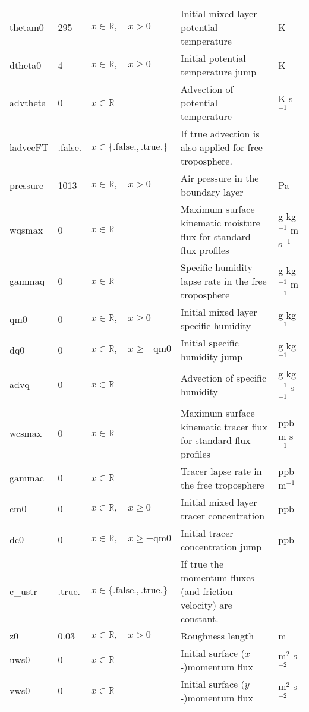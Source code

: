 \documentclass[twoside,11pt,fleqn,a4paper,english,openright]{report}
\begin{document}
\begin{center}
\begin{supertabular}{|l|p{1.2cm}|p{3.4cm}|p{5cm}|l|}
thetam0	& 295		&	$x \in \mathbb{R}, \quad x > 0$		& Initial mixed layer potential temperature	&	K\\
dtheta0	&	4			&	$x \in \mathbb{R},\quad x \geq 0$	& Initial potential temperature jump	&	K\\
advtheta&	0				&	$x \in \mathbb{R}$								&	Advection of potential temperature	& K s$^{-1}$\\
ladvecFT& .false. &	$x\in\{\text{.false.},\text{.true.}\}$	& If true advection is also applied for free troposphere.	& -\\
pressure	&	1013	&	$x \in \mathbb{R}, \quad x > 0$	& Air pressure in the boundary layer	&	Pa\\
wqsmax	&	0			&	$x \in \mathbb{R}$								&	Maximum surface kinematic moisture flux for standard flux profiles	& g kg$^{-1}$ m s$^{-1}$\\
gammaq	&	0			&	$x \in \mathbb{R}$								& Specific humidity lapse rate in the free troposphere	&	g kg$^{-1}$ m$^{-1}$\\
qm0		& 0				&	$x \in \mathbb{R}, \quad x \geq 0$		& Initial mixed layer specific humidity	&	g kg$^{-1}$\\
dq0		&	0				&	$x \in \mathbb{R},\quad x \geq - \text{qm0}$	& Initial specific humidity jump	&	g kg$^{-1}$\\
advq	&	0				&	$x \in \mathbb{R}$								&	Advection of specific humidity	& g kg$^{-1}$ s$^{-1}$\\
wcsmax	&	0			&	$x \in \mathbb{R}$								&	Maximum surface kinematic tracer flux for standard flux profiles	& ppb m s$^{-1}$\\
gammac	&	0			&	$x \in \mathbb{R}$								& Tracer lapse rate in the free troposphere	&	ppb m$^{-1}$\\
cm0		& 0				&	$x \in \mathbb{R}, \quad x \geq 0$		& Initial mixed layer tracer concentration	&	ppb\\
dc0		&	0				&	$x \in \mathbb{R},\quad x \geq - \text{qm0}$	& Initial tracer concentration jump	&	ppb\\
c\_ustr	&	.true.	&	$x\in\{\text{.false.},\text{.true.}\}$	& If true the momentum fluxes (and friction velocity) are constant.	& -\\
z0		&	0.03		&	$x \in \mathbb{R}, \quad x > 0$		& Roughness length	&	m\\
uws0	&	0				&	$x \in \mathbb{R}$								&	Initial surface ($x$-)momentum flux	& m$^{2}$ s$^{-2}$\\
vws0	&	0				&	$x \in \mathbb{R}$								&	Initial surface ($y$-)momentum flux	& m$^{2}$ s$^{-2}$\\

\end{supertabular}
\end{center}
\end{document}
